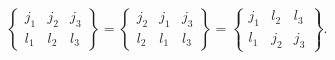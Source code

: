 \[\begin{Bmatrix}j_{1}&j_{2}&j_{3}\\
l_{1}&l_{2}&l_{3}\end{Bmatrix}=\begin{Bmatrix}j_{2}&j_{1}&j_{3}\\
l_{2}&l_{1}&l_{3}\end{Bmatrix}=\begin{Bmatrix}j_{1}&l_{2}&l_{3}\\
l_{1}&j_{2}&j_{3}\end{Bmatrix}.\]
